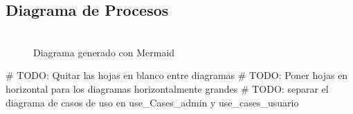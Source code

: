 \documentclass{pretexto/report}
\begin{document}
\subsection{Diagrama de Procesos}
\begin{figure}[H]
    \centering
    \includegraphics[width=0.8]{pdfs/procesos-2-3.pdf}
    \caption{Diagrama generado con Mermaid}
\end{figure}

# TODO: Quitar las hojas en blanco entre diagramas
# TODO: Poner hojas en horizontal para los diagramas horizontalmente grandes
# TODO: separar el diagrama de casos de uso en use_Cases_admin y use_cases_usuario
\end{document}
